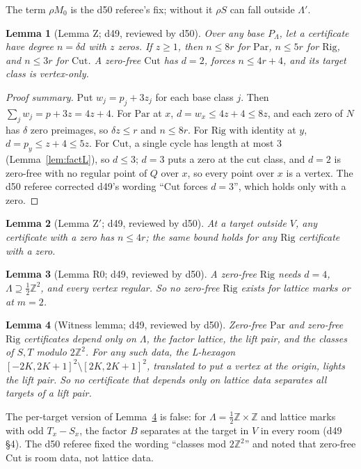 \documentclass[11pt]{article}
\newtheorem{lemma}{Lemma}
\theoremstyle{definition}
\theoremstyle{remark}
\newcommand{\Z}{\mathbb Z}
\newcommand{\Par}{\mathrm{Par}}
\newcommand{\Rig}{\mathrm{Rig}}
\newcommand{\Cut}{\mathrm{Cut}}
\begin{document}
The term $\rho M_0$ is the d50 referee's fix; without it $\rho S$ can fall
outside $\Lambda'$.

\begin{lemma}[Lemma Z; d49, reviewed by d50]\label{lem:Z}
Over any base $P_\Lambda$, let a certificate have degree $n=\delta d$ with $z$
zeros. If $z\ge 1$, then $n\le 8r$ for $\Par$, $n\le 5r$ for $\Rig$, and
$n\le 3r$ for $\Cut$. A zero-free $\Cut$ has $d=2$, forces $n\le 4r+4$, and its
target class is vertex-only.
\end{lemma}

\begin{proof}[Proof summary]
Put $w_j=p_j+3z_j$ for each base class $j$. Then
$\sum_j w_j=p+3z=4z+4$. For $\Par$ at $x$, $d=w_x\le 4z+4\le 8z$, and each
zero of $N$ has $\delta$ zero preimages, so $\delta z\le r$ and $n\le 8r$. For
$\Rig$ with identity at $y$, $d=p_y\le z+4\le 5z$. For $\Cut$, a single cycle
has length at most $3$ (Lemma~\ref{lem:factL}), so $d\le 3$; $d=3$ puts a zero
at the cut class, and $d=2$ is zero-free with no regular point of $Q$ over $x$,
so every point over $x$ is a vertex. The d50 referee corrected d49's wording
``$\Cut$ forces $d=3$'', which holds only with a zero.
\end{proof}

\begin{lemma}[Lemma Z$'$; d49, reviewed by d50]\label{lem:Zprime}
At a target outside $V$, any certificate with a zero has $n\le 4r$; the same
bound holds for any $\Rig$ certificate with a zero.
\end{lemma}

\begin{lemma}[Lemma R0; d49, reviewed by d50]\label{lem:R0}
A zero-free $\Rig$ needs $d=4$, $\Lambda\supseteq\frac12\Z^2$, and every vertex
regular. So no zero-free $\Rig$ exists for lattice marks or at $m=2$.
\end{lemma}

\begin{lemma}[Witness lemma; d49, reviewed by d50]\label{lem:witness}
Zero-free $\Par$ and zero-free $\Rig$ certificates depend only on $\Lambda$,
the factor lattice, the lift pair, and the classes of $S,T$ modulo $2\Z^2$.
For any such data, the L-hexagon $[-2K,2K+1]^2\setminus[2K,2K+1]^2$, translated
to put a vertex at the origin, lights the lift pair. So no certificate that
depends only on lattice data separates all targets of a lift pair.
\end{lemma}

The per-target version of Lemma~\ref{lem:witness} is false: for
$\Lambda=\frac12\Z\times\Z$ and lattice marks with odd $T_x-S_x$, the factor
$B$ separates at the target in $V$ in every room (d49 \S4). The d50 referee
fixed the wording ``classes mod $2\Z^2$'' and noted that zero-free $\Cut$ is
room data, not lattice data.
\end{document}
